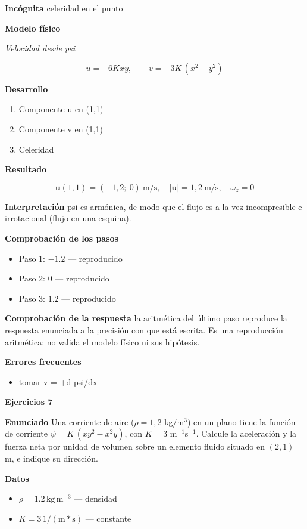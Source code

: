 \documentclass[10pt,openany]{book}
\begin{document}
\noindent\textbf{Incógnita}
celeridad en el punto

\noindent\textbf{Modelo físico}

\noindent\textit{Velocidad desde psi}

\[
u = -6Kxy,\qquad v = -3K\,(x^{2} - y^{2})
\]

\noindent\textbf{Desarrollo}
\begin{enumerate}
\item
Componente u en (1,1)
\item
Componente v en (1,1)
\item
Celeridad
\end{enumerate}

\noindent\textbf{Resultado}

\[
\mathbf{u}(1, 1) = (-1{,}2;\ 0)\ \mathrm{m/s},\quad |\mathbf{u}| = 1{,}2\ \mathrm{m/s},\quad \omega_z = 0
\]

\noindent\textbf{Interpretación}
psi es armónica, de modo que el flujo es a la vez incompresible e irrotacional (flujo en una esquina).

\noindent\textbf{Comprobación de los pasos}
\begin{itemize}
\item Paso 1: $-1.2$ — reproducido
\item Paso 2: $0$ — reproducido
\item Paso 3: $1.2$ — reproducido
\end{itemize}

\noindent\textbf{Comprobación de la respuesta} la aritmética del último paso reproduce la respuesta enunciada a la precisión con que está escrita. Es una reproducción aritmética; no valida el modelo físico ni sus hipótesis.

\noindent\textbf{Errores frecuentes}
\begin{itemize}
\item tomar v = +d psi/dx
\end{itemize}

\noindent\textbf{Ejercicios 7}

\noindent\textbf{Enunciado}
Una corriente de aire (\(\rho = 1{,}2\) kg/m\(^3\)) en un plano tiene la función de corriente \(\psi = K\,(xy^{2} - x^{2}y)\), con \(K = 3\) m\(^{-1}\)s\(^{-1}\). Calcule la aceleración y la fuerza neta por unidad de volumen sobre un elemento fluido situado en \((2, 1)\) m, e indique su dirección.

\noindent\textbf{Datos}
\begin{itemize}
\item $\rho = 1.2\,\mathrm{kg}\,\mathrm{m}^{-3}$ — densidad
\item $K = 3\,\mathrm{1/(m*s)}$ — constante
\end{itemize}
\end{document}
